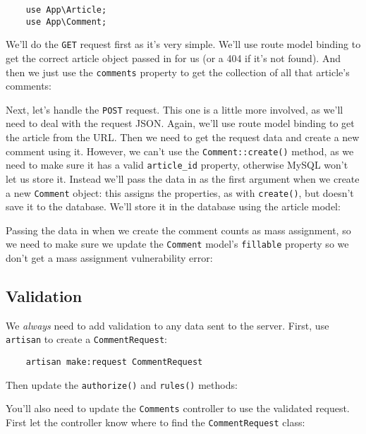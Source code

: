 \begin{verbatim}
    use App\Article;
    use App\Comment;
\end{verbatim}

We'll do the \texttt{GET} request first as it's very simple. We'll use route model binding to get the correct article object passed in for us (or a 404 if it's not found). And then we just use the \texttt{comments} property to get the collection of all that article's comments:


Next, let's handle the \texttt{POST} request. This one is a little more involved, as we'll need to deal with the request JSON. Again, we'll use route model binding to get the article from the URL. Then we need to get the request data and create a new comment using it. However, we can't use the \texttt{Comment::create()} method, as we need to make sure it has a valid \texttt{article\_id} property, otherwise MySQL won't let us store it. Instead we'll pass the data in as the first argument when we create a new \texttt{Comment} object: this assigns the properties, as with \texttt{create()}, but doesn't save it to the database. We'll store it in the database using the article model:


Passing the data in when we create the comment counts as mass assignment, so we need to make sure we update the \texttt{Comment} model's \texttt{fillable} property so we don't get a mass assignment vulnerability error:



\subsection{Validation}

We \textit{always} need to add validation to any data sent to the server. First, use \texttt{artisan} to create a \texttt{CommentRequest}:

\begin{verbatim}
    artisan make:request CommentRequest
\end{verbatim}

Then update the \texttt{authorize()} and \texttt{rules()} methods:


You'll also need to update the \texttt{Comments} controller to use the validated request. First let the controller know where to find the \texttt{CommentRequest} class:

